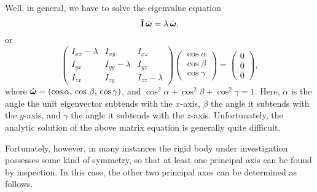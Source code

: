 Well, in general, we have to solve the eigenvalue equation
\begin{equation}
\tilde{\bf I}\,\hat{\mbox{\boldmath$\omega$}} = \lambda\,\hat{\mbox{\boldmath$\omega$}},
\end{equation}
or
\begin{equation}\label{e9.39}
\left(\begin{array}{ccc}
I_{xx}-\lambda&I_{xy}&I_{xz}\\
I_{yx}&I_{yy}-\lambda&I_{yz}\\
I_{zx}&I_{zy}&I_{zz}-\lambda
\end{array}\right)\left(\begin{array}{c}\cos\alpha\\\cos\beta\\\cos\gamma\end{array}\right) = \left(\begin{array}{c}0\\0\\0\end{array}\right),
\end{equation}
where $\hat{\mbox{\boldmath$\omega$}} = (\cos\alpha,\,\cos\,\beta,\,\cos\gamma)$, and $\cos^2\alpha+\cos^2\beta+\cos^2\gamma=1$. Here, $\alpha$ is the angle the unit eigenvector subtends with the $x$-axis, $\beta$ the angle it
subtends with the $y$-axis, and $\gamma$ the angle it subtends with the $z$-axis. Unfortunately, the analytic solution of the above matrix equation
is generally quite difficult.

Fortunately, however, in many instances the rigid body under investigation possesses some
kind of symmetry, so that at least one principal axis can be found by
inspection. In this case, the other two principal axes can be determined
as follows. 

